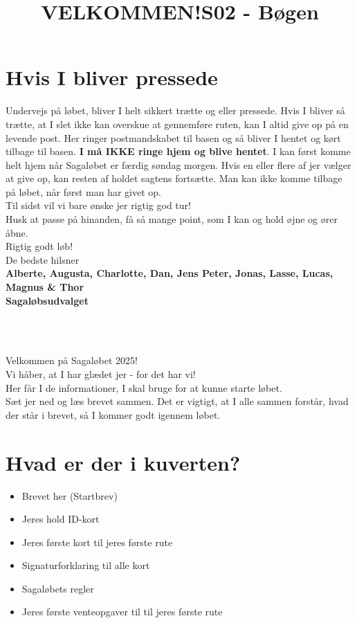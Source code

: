 \section{Hvis I bliver pressede}
Undervejs på løbet, bliver I helt sikkert trætte og eller pressede. Hvis I bliver så trætte, at I slet ikke kan overskue at gennemføre ruten, kan I altid give op på en levende post. Her ringer postmandskabet til basen og så bliver I hentet og kørt tilbage til basen. \textbf{I må IKKE ringe hjem og blive hentet}. I kan først komme helt hjem når Sagaløbet er færdig søndag morgen. Hvis en eller flere af jer vælger at give op, kan resten af holdet sagtens fortsætte. Man kan ikke komme tilbage på løbet, når først man har givet op.\\
\newline
Til sidst vil vi bare ønske jer rigtig god tur!\\
Husk at passe på hinanden, få så mange point, som I kan og hold øjne og ører åbne.\\
\newline
Rigtig godt løb!\\
\newline
\textcolor{søblå}{De bedste hilsner}\\
\textcolor{natblå}{\textbf{Alberte, Augusta, Charlotte, Dan, Jens Peter, Jonas, Lasse, Lucas, Magnus \& Thor}}\\
\textcolor{natblå}{\textbf{Sagaløbsudvalget}}\\
\newpage
\title{VELKOMMEN!}\\
\newline
\title{\textcolor{flammefarvet}{S02 - Bøgen }}\\
\newline
Velkommen på Sagaløbet 2025!\\
Vi håber, at I har glædet jer - for det har vi!\\
Her får I de informationer, I skal bruge for at kunne starte løbet.\\
Sæt jer ned og læs brevet sammen. Det er vigtigt, at I alle sammen forstår, hvad der står i brevet, så I kommer godt igennem løbet.
\section{Hvad er der i kuverten?}
\begin{itemize}
    \item Brevet her (Startbrev)
    \item Jeres hold ID-kort
    \item Jeres første kort til jeres første rute
    \item Signaturforklaring til alle kort
    \item Sagaløbets regler
    \item Jeres første venteopgaver til til jeres første rute
\end{itemize}
